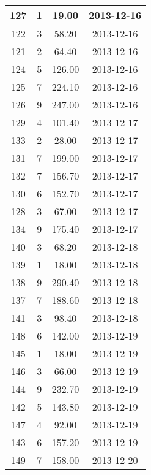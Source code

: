 \documentclass[a4paper,11pt]{article}
\begin{document}
\begin{longtable}{|c|c|c|c|}
	 127 &   1 &  19.00 & 2013-12-16\\ \hline
	 122 &   3 &  58.20 & 2013-12-16\\ \hline
	 121 &   2 &  64.40 & 2013-12-16\\ \hline
	 124 &   5 & 126.00 & 2013-12-16\\ \hline
	 125 &   7 & 224.10 & 2013-12-16\\ \hline
	 126 &   9 & 247.00 & 2013-12-16\\ \hline
	 129 &   4 & 101.40 & 2013-12-17\\ \hline
	 133 &   2 &  28.00 & 2013-12-17\\ \hline
	 131 &   7 & 199.00 & 2013-12-17\\ \hline
	 132 &   7 & 156.70 & 2013-12-17\\ \hline
	 130 &   6 & 152.70 & 2013-12-17\\ \hline
	 128 &   3 &  67.00 & 2013-12-17\\ \hline
	 134 &   9 & 175.40 & 2013-12-17\\ \hline
	 140 &   3 &  68.20 & 2013-12-18\\ \hline
	 139 &   1 &  18.00 & 2013-12-18\\ \hline
	 138 &   9 & 290.40 & 2013-12-18\\ \hline
	 137 &   7 & 188.60 & 2013-12-18\\ \hline
	 141 &   3 &  98.40 & 2013-12-18\\ \hline
	 148 &   6 & 142.00 & 2013-12-19\\ \hline
	 145 &   1 &  18.00 & 2013-12-19\\ \hline
	 146 &   3 &  66.00 & 2013-12-19\\ \hline
	 144 &   9 & 232.70 & 2013-12-19\\ \hline
	 142 &   5 & 143.80 & 2013-12-19\\ \hline
	 147 &   4 &  92.00 & 2013-12-19\\ \hline
	 143 &   6 & 157.20 & 2013-12-19\\ \hline
	 149 &   7 & 158.00 & 2013-12-20\\ \hline
	 
\end{longtable}
\end{document}
